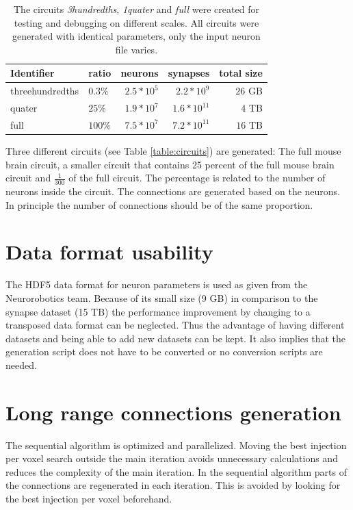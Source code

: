\begin{table}[ht!]
\begin{centering}
    \begin{tabular}{ | l | l | r | r | r |}
    \hline
    Identifier & ratio & neurons & synapses & total size \\ \hline \hline
    threehundredths & $0.3\%$ & $~2.5*10^5$ & $~2.2*10^9$ & $~26$ GB \\ \hline
    quater & $25\%$ & $~1.9*10^7$ & $~1.6*10^{11}$ & $~4$ TB \\ \hline
    full & $100\%$ & $~7.5*10^7$ & $~7.2*10^{11}$ & $~16$ TB \\ \hline
    \end{tabular}
    \caption{The circuits \emph{3hundredths}, \emph{1quater} and \emph{full} were created for testing and debugging on different scales.
All circuits were generated with identical parameters, only the input neuron file varies.}
\end{centering}
    \end{table}


\label{table:circuits}

Three different circuits (see Table \ref{table:circuits}) are generated: The full mouse brain circuit,
a smaller circuit that contains 25 percent of the full mouse brain circuit and
$\frac{1}{300}$ of the full circuit. The percentage is related to the number of neurons inside
the circuit. The connections are generated based on the neurons. In principle the
number of connections should be of the same proportion.

\section{Data format usability}
The HDF5 data format for neuron parameters is used as given from the Neurorobotics team.
Because of its small size (9 GB) in comparison to the synapse dataset (15 TB) the performance improvement by changing
to a transposed data format can be neglected. Thus the advantage of having different datasets and being able
to add new datasets can be kept. It also implies that the generation script does not have to be converted or no 
conversion scripts are needed.


\section{Long range connections generation}
The sequential algorithm is optimized and parallelized.
Moving the best injection per voxel search outside the main iteration
avoids unnecessary calculations and reduces the complexity of the main iteration.
In the sequential algorithm parts of the connections are regenerated in each iteration.
This is avoided by looking for the best injection per voxel beforehand.


